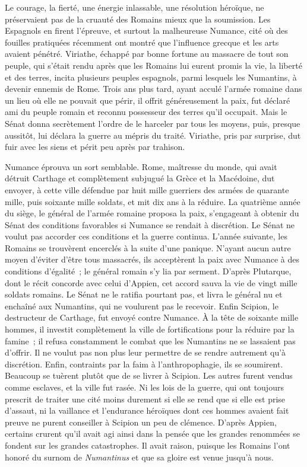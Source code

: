 \documentclass[french,twoside]{book} %
\begin{document}
Le courage, la fierté, une énergie inlassable, une résolution héroïque, ne préservaient pas de la cruauté des Romains mieux que la soumission. Les Espagnols en firent l'épreuve, et surtout la malheureuse Numance, cité où des fouilles pratiquées récemment ont montré que l'influence grecque et les arts avaient pénétré. Viriathe, échappé par bonne fortune au massacre de tout son peuple, qui s'était rendu après que les Romains lui eurent promis la vie, la liberté et des terres, incita plusieurs peuples espagnols, parmi lesquels les Numantins, à devenir ennemis de Rome. Trois ans plus tard, ayant acculé l'armée romaine dans un lieu où elle ne pouvait que périr, il offrit généreuse­ment la paix, fut déclaré ami du peuple romain et reconnu possesseur des terres qu'il occupait. Mais le Sénat donna secrètement l'ordre de le harceler par tous les moyens, puis, presque aussitôt, lui déclara la guerre au mépris du traité. Viriathe, pris par surprise, dut fuir avec les siens et périt peu après par trahison.\par
Numance éprouva un sort semblable. Rome, maîtresse du monde, qui avait détruit Carthage et complètement subjugué la Grèce et la Macédoine, dut envoyer, à cette ville défendue par huit mille guerriers des armées de quarante mille, puis soixante mille soldats, et mit dix ans à la réduire. La quatrième année du siège, le général de l'armée romaine proposa la paix, s'engageant à obtenir du Sénat des conditions favorables si Numance se rendait à discrétion. Le Sénat ne voulut pas accorder ces conditions et la guerre continua. L'année suivante, les Romains se trouvèrent encerclés à la suite d'une panique. N'ayant aucun autre moyen d’éviter d'être tous massacrés, ils acceptèrent la paix avec Numance à des conditions d'égalité ; le général romain s'y lia par serment. D'après Plutarque, dont le récit concorde avec celui d'Appien, cet accord sauva la vie de vingt mille soldats romains. Le Sénat ne le ratifia pourtant pas, et livra le général nu et enchaîné aux Numantins, qui ne voulurent pas le rece­voir. Enfin Scipion, le destructeur de Carthage, fut envoyé contre Numance. À la tête de soixante mille hommes, il investit complètement la ville de fortifications pour la réduire par la famine ; il refusa constamment le combat que les Numantins ne se lassaient pas d'offrir. Il ne voulut pas non plus leur permettre de se rendre autrement qu'à discrétion. Enfin, contraints par la faim à l'anthropophagie, ils se soumirent. Beaucoup se tuèrent plutôt que de se livrer à Scipion. Les autres furent vendus comme esclaves, et la ville fut rasée. Ni les lois de la guerre, qui ont toujours prescrit de traiter une cité moins dure­ment si elle se rend que si elle est prise d'assaut, ni la vaillance et l'endurance héroïques dont ces hommes avaient fait preuve ne purent conseiller à Scipion un peu de clémence. D'après Appien, certains crurent qu'il avait agi ainsi dans la pensée que les grandes renommées se fondent sur les grandes catastrophes. Il avait raison, puisque les Romains l'ont honoré du surnom de {\itshape Numantinus} et que sa gloire est venue jusqu'à nous.\par
\end{document}
